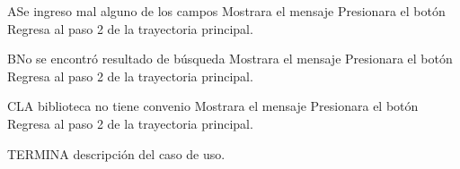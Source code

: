 		\begin{UCtrayectoriaA}{A}{Se ingreso mal alguno de los campos}
			\UCpaso[\UCsist] Mostrara el mensaje 
			\UCpaso[\UCactor] Presionara el botón 
			\UCpaso[\UCsist] Regresa al paso 2 de la trayectoria principal.
		\end{UCtrayectoriaA}

		\begin{UCtrayectoriaA}{B}{No se encontró resultado de búsqueda}
			\UCpaso[\UCsist] Mostrara el mensaje 
			\UCpaso[\UCactor]Presionara el botón 			
			\UCpaso[\UCsist] Regresa al paso 2 de la trayectoria principal.
		\end{UCtrayectoriaA}
		
		\begin{UCtrayectoriaA}{C}{LA biblioteca no tiene convenio}
			\UCpaso[\UCsist] Mostrara el mensaje 
			\UCpaso[\UCactor] Presionara el botón 
			\UCpaso[\UCsist] Regresa al paso 2 de la trayectoria principal.
		\end{UCtrayectoriaA}
TERMINA descripción del caso de uso.
